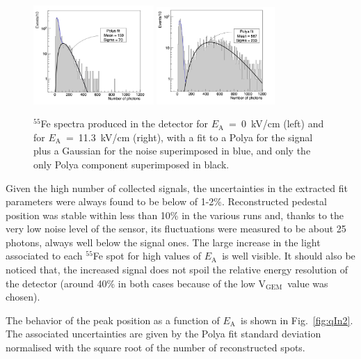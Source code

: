 \documentclass[a4paper,11pt]{article}
\newcommand{\Ea}  {$E_{\mathrm{A}}$}
\newcommand{\Vg}  {V$_{\mathrm{GEM}}$}
\begin{document}
\begin{figure}[h!]
\centering
\includegraphics[width=0.407\textwidth]{hqIn_3540.png}
\includegraphics[width=0.4\textwidth]{hqIn_3629.png}
\caption{$^{55}$Fe spectra produced in the detector for \Ea~=~0~kV/cm (left) and for \Ea~=~11.3~kV/cm (right), with a fit to a Polya for the signal plus a Gaussian for the noise superimposed in blue, and only the only Polya component superimposed
in black.} 
\label{fig:qIn}
\end{figure}

Given the high number of collected signals, the uncertainties in the extracted fit parameters 
were always found to be below of 1-2\%. 
Reconstructed pedestal position was stable within less than 10\% in the various runs and, thanks to the very low noise level of the sensor, its fluctuations were measured to be about 25 photons, always well below the signal ones.
The large increase in the light associated to each $^{55}$Fe spot for high values of \Ea\ is well visible. 
It should also be noticed that, the increased signal does not spoil the relative energy resolution of the detector (around 40\% in both cases because of the low \Vg\ value was chosen). 

The behavior of the peak position as a function of \Ea\ is shown in Fig.~\ref{fig:qIn2}. 
The associated uncertainties are given by the Polya fit standard deviation normalised 
with the square root of the number of reconstructed spots.
\end{document}
